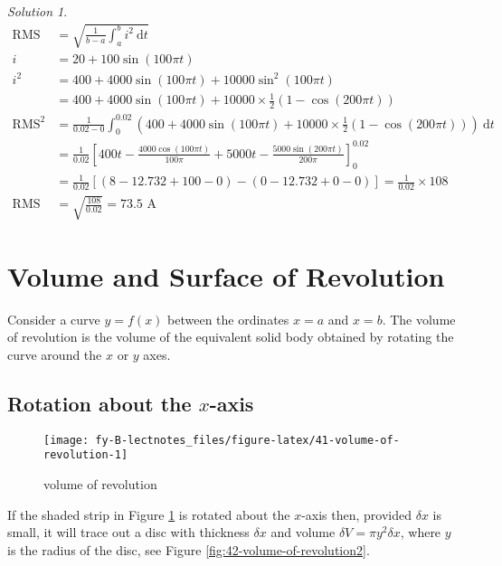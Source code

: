 \documentclass[
  english,
  11pt,
  oneside]{book}
\newcommand{\slide}{}
\theoremstyle{definition}
\theoremstyle{definition}
\theoremstyle{definition}
\theoremstyle{definition}
\theoremstyle{remark}
\newtheorem*{solution}{Solution}
\begin{document}
\begin{solution}
\begin{align*}
\text{RMS}&= \sqrt{\frac{1}{b-a}\int_a^b i^2\ \mathrm{d}t}\\
i&=20+100\sin(100\pi t)\\
i^2&=400+4000\sin(100\pi t)+10000\sin^2(100\pi t)\\
&=400+4000\sin(100\pi t)+10000\times\frac 12(1-\cos(200\pi t))\\
\text{RMS}^2&=\frac1{0.02-0}\int_0^{0.02}(400+4000\sin(100\pi t)+10000\times\frac 12(1-\cos(200\pi t)))\ \mathrm{d}t\\
&=\frac1{0.02}\left[400t-\frac{4000\cos(100\pi t)}{100\pi}+5000t-\frac{5000\sin(200\pi t)}{200\pi}\right]_0^{0.02}\\
&=\frac1{0.02}\left[(8-12.732+100-0)-(0-12.732+0-0)\right] = \frac1{0.02}\times108\\
\text{RMS}&=\sqrt{\frac{108}{0.02}}=73.5\text{ A}
\end{align*}
\end{solution}

\slide

\section{Volume and Surface of Revolution}\label{volume-and-surface-of-revolution}

Consider a curve \(y = f(x)\) between the ordinates \(x = a\) and \(x = b\). The volume of revolution is the volume of the equivalent solid body obtained by rotating the curve around the \(x\) or \(y\) axes.

\slide

\subsection{\texorpdfstring{Rotation about the \(x\)-axis}{Rotation about the x-axis}}\label{rotation-about-the-x-axis}

\begin{figure}

{\centering \texttt{[image: fy-B-lectnotes\_files/figure-latex/41-volume-of-revolution-1]} 

}

\caption{volume of revolution}\label{fig:41-volume-of-revolution}
\end{figure}

If the shaded strip in Figure \ref{fig:41-volume-of-revolution} is rotated about the \(x\)-axis then, provided \(\delta x\) is small, it will trace out a disc with thickness \(\delta x\) and volume \(\delta V = \pi y^2\delta x\), where \(y\) is the radius of the disc, see Figure \ref{fig:42-volume-of-revolution2}.
\slide
\end{document}
